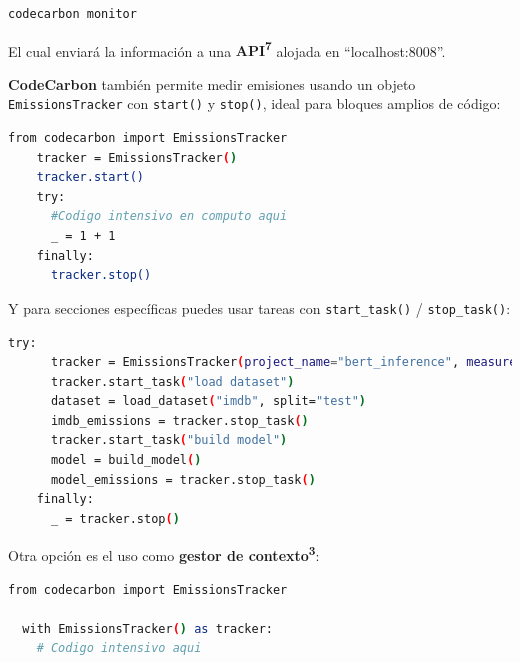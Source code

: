 \documentclass[12pt,a4paper]{report}
\begin{document}
\begin{tcolorbox}[colback=codebackground, colframe=codeborder, boxrule=0.8pt, arc=0mm, boxsep=5pt, left=5pt, right=5pt, top=5pt, bottom=5pt]
  \begin{lstlisting}[language=bash]
    codecarbon monitor
  \end{lstlisting}
\end{tcolorbox}

El cual enviará la información a una \textbf{API\textsuperscript{7}} alojada en “localhost:8008”.

\textbf{CodeCarbon} también permite medir emisiones usando un objeto \texttt{EmissionsTracker} con \texttt{start()} y \texttt{stop()}, ideal para bloques amplios de código:

\begin{tcolorbox}[colback=codebackground, colframe=codeborder, boxrule=0.8pt, arc=0mm, boxsep=5pt, left=5pt, right=5pt, top=5pt, bottom=5pt]
  \begin{lstlisting}[language=bash]
    from codecarbon import EmissionsTracker
    tracker = EmissionsTracker()
    tracker.start()
    try:
      #Codigo intensivo en computo aqui
      _ = 1 + 1
    finally:
      tracker.stop()
  \end{lstlisting}
\end{tcolorbox}

Y para secciones específicas puedes usar tareas con \texttt{start\_task()} / \texttt{stop\_task()}:

\begin{tcolorbox}[colback=codebackground, colframe=codeborder, boxrule=0.8pt, arc=0mm, boxsep=5pt, left=5pt, right=5pt, top=5pt, bottom=5pt]
  \begin{lstlisting}[language=bash]
    try:
      tracker = EmissionsTracker(project_name="bert_inference", measure_power_secs=10)
      tracker.start_task("load dataset")
      dataset = load_dataset("imdb", split="test")
      imdb_emissions = tracker.stop_task()
      tracker.start_task("build model")
      model = build_model()
      model_emissions = tracker.stop_task()
    finally:
      _ = tracker.stop()
  \end{lstlisting}
\end{tcolorbox}

Otra opción es el uso como \textbf{gestor de contexto\textsuperscript{3}}:

\begin{tcolorbox}[colback=codebackground, colframe=codeborder, boxrule=0.8pt, arc=0mm, boxsep=5pt, left=5pt, right=5pt, top=5pt, bottom=5pt]
  \begin{lstlisting}[language=bash]
  from codecarbon import EmissionsTracker

  with EmissionsTracker() as tracker:
    # Codigo intensivo aqui
  \end{lstlisting}
\end{tcolorbox}
\end{document}
